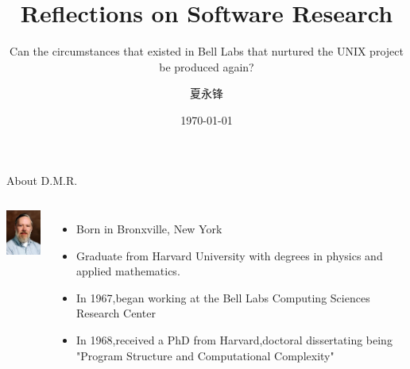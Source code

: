 \documentclass[CJK]{beamer}
\begin{document}
\begin{CJK*}{UTF8}{gbsn}

\title{Reflections on Software Research}
\subtitle{Can the circumstances that existed in Bell Labs that nurtured the UNIX project be produced again?}
\author{夏永锋}
\date{\today}

\begin{frame}
	\titlepage
\end{frame}
{\tiny
\begin{frame}{About D.M.R.}
\begin{columns}
	\column{2cm}
	\begin{center}
		\includegraphics[width=2cm]{DMR.jpg}
	\end{center}
	\column{8cm}
	\begin{itemize}
		\item Born in Bronxville, New York
		\item Graduate from Harvard University with degrees in physics and applied mathematics.
		\item In 1967,began working at the Bell Labs Computing Sciences Research Center
		\item In 1968,received a PhD from Harvard,doctoral dissertating being "Program Structure and Computational Complexity"
	\end{itemize}


\end{columns}
\end{frame}}
\end{CJK*}
\end{document}
